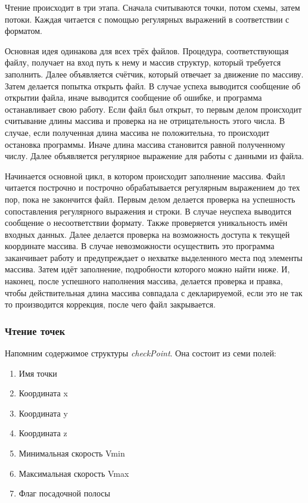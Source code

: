 \documentclass[12pt, a4 paper]{article}
\theoremstyle{plain}
\begin{document}
Чтение происходит в три этапа. Сначала считываются точки, потом схемы, затем потоки. Каждая читается с помощью регулярных выражений в соответствии с форматом.

Основная идея одинакова для всех трёх файлов. Процедура, соответствующая файлу, получает на вход путь к нему и массив структур, который требуется заполнить. Далее объявляется счётчик, который отвечает за движение по массиву. Затем делается попытка открыть файл. В случае успеха выводится сообщение об открытии файла, иначе выводится сообщение об ошибке, и программа останавливает свою работу. Если файл был открыт, то первым делом происходит считывание длины массива и проверка на не отрицательность этого числа. В случае, если полученная длина массива не положительна, то происходит остановка программы. Иначе длина массива становится равной полученному числу. Далее объявляется регулярное выражение для работы с данными из файла. 

Начинается основной цикл, в котором происходит заполнение массива. Файл читается построчно и построчно обрабатывается регулярным выражением до тех пор, пока не закончится файл. Первым делом делается проверка на успешность сопоставления регулярного выражения и строки. В случае неуспеха выводится сообщение о несоответствии формату. Также проверяется уникальность имён входных данных. Далее делается проверка на возможность доступа к текущей координате массива. В случае невозможности осуществить это программа заканчивает работу и предупреждает о нехватке выделенного места под элементы массива. Затем идёт заполнение, подробности которого можно найти ниже. И, наконец, после успешного наполнения массива, делается проверка и правка, чтобы действительная длина массива совпадала с декларируемой, если это не так то производится коррекция, после чего файл закрывается.




\subsubsection{Чтение точек}

Напомним содержимое структуры \textit{checkPoint}. Она состоит из семи полей:

\begin{enumerate}
	\item Имя точки
	\item Координата x
	\item Координата y
	\item Координата z
	\item Минимальная скорость Vmin
	\item Максимальная скорость Vmax
	\item Флаг посадочной полосы
\end{enumerate}
\end{document}
